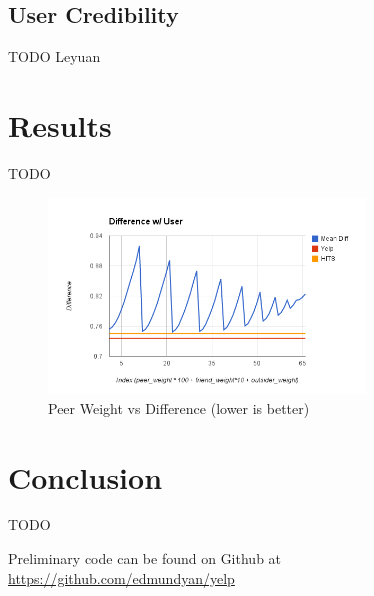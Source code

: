 \documentclass[10pt]{article}
\begin{document}
\subsection{User Credibility}

TODO Leyuan

\section{Results}
\label{sec:results}
TODO


\begin{figure}[ht]
  \centering
    \includegraphics[width=0.75\textwidth]{temp_results.png}
  \caption{Peer Weight vs Difference (lower is better)}
  \label{fig:social_degree}
\end{figure}


\section{Conclusion}
\label{sec:conclusion}
TODO


Preliminary code can be found on Github at \url{https://github.com/edmundyan/yelp}

\printbibliography
\end{document}
